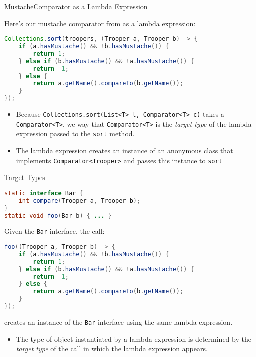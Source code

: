 \documentclass{beamer}
\begin{document}
\begin{frame}[fragile]{MustacheComparator as a Lambda Expression}

Here's our mustache comparator from   as a lambda expression:

\begin{lstlisting}[language=Java]
Collections.sort(troopers, (Trooper a, Trooper b) -> {
    if (a.hasMustache() && !b.hasMustache()) {
        return 1;
    } else if (b.hasMustache() && !a.hasMustache()) {
        return -1;
    } else {
        return a.getName().compareTo(b.getName());
    }
});
\end{lstlisting}

\begin{itemize}
\item Because {\tt Collections.sort(List<T> l, Comparator<T> c)} takes a {\tt Comparator<T>}, we way that {\tt Comparator<T>} is the {\it target type} of the lambda expression passed to the {\tt sort} method.
\item The lambda expression creates an instance of an anonymous class that implements {\tt Comparator<Trooper>} and passes this instance to {\tt sort}
\end{itemize}

\end{frame}

\begin{frame}[fragile]{Target Types}
\vspace{-.05in}
\begin{lstlisting}[language=Java]
static interface Bar {
    int compare(Trooper a, Trooper b);
}
static void foo(Bar b) { ... }
\end{lstlisting}
\vspace{-.05in}
Given the {\tt Bar} interface, the call:
\vspace{-.05in}
\begin{lstlisting}[language=Java]
foo((Trooper a, Trooper b) -> {
    if (a.hasMustache() && !b.hasMustache()) {
        return 1;
    } else if (b.hasMustache() && !a.hasMustache()) {
        return -1;
    } else {
        return a.getName().compareTo(b.getName());
    }
});
\end{lstlisting}
\vspace{-.05in}
creates an instance of the {\tt Bar} interface using the same lambda expression.
\vspace{-.05in}
\begin{itemize}
\item The type of object instantiated by a lambda expression is determined by the {\it target type} of the call in which the lambda expression appears.
\end{itemize}


\end{frame}
\end{document}
